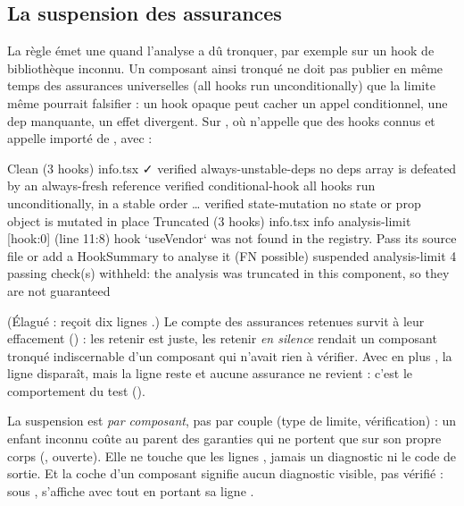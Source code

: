 \subsection{La suspension des assurances}
\label{sec:api-regles-suspension}

La règle  émet une \Info{} quand l'analyse a dû tronquer, par exemple sur un hook de bibliothèque inconnu. Un composant ainsi tronqué ne doit pas publier en même temps des assurances universelles (\og all hooks run unconditionally\fg) que la limite même pourrait falsifier : un hook opaque peut cacher un appel conditionnel, une dep manquante, un effet divergent. Sur , où  n'appelle que des hooks connus et  appelle  importé de , avec  :

\begin{sortie}
  Clean  (3 hooks)  info.tsx  ✓
    verified  always-unstable-deps  no deps array is defeated by an always-fresh reference
    verified  conditional-hook  all hooks run unconditionally, in a stable order
    …
    verified  state-mutation  no state or prop object is mutated in place
  Truncated  (3 hooks)  info.tsx
    info   analysis-limit  [hook:0]  (line 11:8)  hook `useVendor` was not found in the registry. Pass its source file or add a HookSummary to analyse it (FN possible)
    suspended  analysis-limit  4 passing check(s) withheld: the analysis was truncated in this component, so they are not guaranteed
\end{sortie}

(Élagué :  reçoit dix lignes .) Le compte des assurances retenues survit à leur effacement () : les retenir est juste, les retenir \emph{en silence} rendait un composant tronqué indiscernable d'un composant qui n'avait rien à vérifier. Avec en plus , la ligne  disparaît, mais la ligne  reste et aucune assurance ne revient : c'est le comportement du test  ().

\begin{piege}
La suspension est \emph{par composant}, pas par couple (type de limite, vérification) : un enfant inconnu coûte au parent des garanties qui ne portent que sur son propre corps (, ouverte). Elle ne touche que les lignes , jamais un diagnostic ni le code de sortie. Et la coche  d'un composant signifie \og aucun diagnostic visible\fg, pas \og vérifié\fg{} : sous ,  s'affiche avec  tout en portant sa ligne .
\end{piege}

